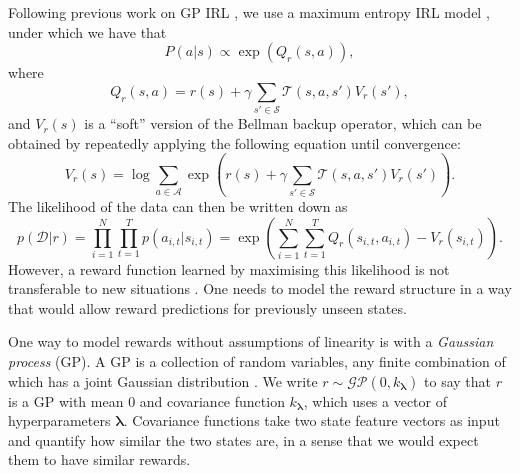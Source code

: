 \documentclass{mprop}
\theoremstyle{definition}
\begin{document}
Following previous work on GP IRL
\cite{DBLP:conf/nips/LevinePK11,DBLP:conf/uai/JinDAS17}, we use a maximum
entropy IRL model \cite{ziebart2008maximum}, under which we have that
\[ P(a | s) \propto \exp(Q_r(s, a)), \]
where
\begin{equation}
  Q_r(s, a) = r(s) + \gamma\sum_{s' \in \mathcal{S}}
  \mathcal{T}(s, a, s')V_r(s'),
\end{equation}
and $V_r(s)$ is a ``soft'' version of the Bellman backup operator, which can be
obtained by repeatedly applying the following equation until convergence:
\cite{DBLP:conf/nips/LevinePK11,supplementary_material}
\[ V_r(s) = \log \sum_{a \in \mathcal{A}} \exp\left( r(s) + \gamma\sum_{s' \in
      \mathcal{S}} \mathcal{T}(s, a, s')V_r(s') \right). \]
The likelihood of the data can then be written down as
\cite{DBLP:conf/uai/JinDAS17,DBLP:conf/nips/LevinePK11}
\begin{equation} \label{pDr}
  p(\mathcal{D} | r) = \prod_{i=1}^N \prod_{t=1}^T p(a_{i,t} | s_{i,t}) = \exp\left( \sum_{i=1}^N \sum_{t=1}^T Q_r(s_{i,t}, a_{i,t}) - V_r(s_{i,t}) \right).
\end{equation}
However, a reward function learned by maximising this likelihood is not
transferable to new situations
\cite{DBLP:conf/uai/JinDAS17,DBLP:conf/nips/LevinePK11}. One needs to model the
reward structure in a way that would allow reward predictions for previously
unseen states.

One way to model rewards without assumptions of linearity is with a
\emph{Gaussian process} (GP). A GP is a collection of random variables, any
finite combination of which has a joint Gaussian distribution
\cite{DBLP:books/lib/RasmussenW06}. We write $r \sim \mathcal{GP}(0,
k_{\bm\lambda})$ to say that $r$ is a GP with mean $0$ and covariance function
$k_{\bm\lambda}$, which uses a vector of hyperparameters $\bm\lambda$.
Covariance functions take two state feature vectors as input and quantify how
similar the two states are, in a sense that we would expect them to have similar
rewards.
\end{document}
